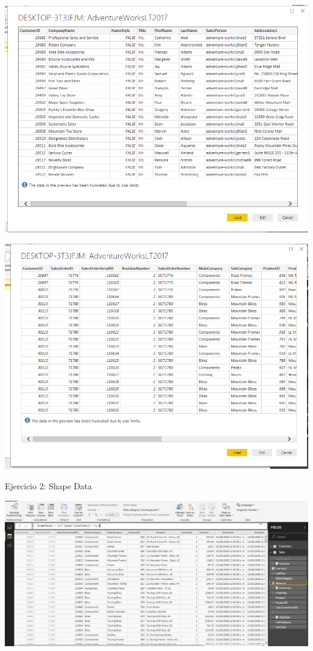 	\begin{center}
	\includegraphics[width=15cm]{./Imagenes/EJER1T1(3)}
	\end{center}	

	\begin{center}
	\includegraphics[width=15cm]{./Imagenes/EJER1T1(4)}
	\end{center}	
Ejercicio 2: Shape Data\\
	\begin{center}
	\includegraphics[width=15cm]{./Imagenes/EJER1T2(1)}
	\end{center}	

